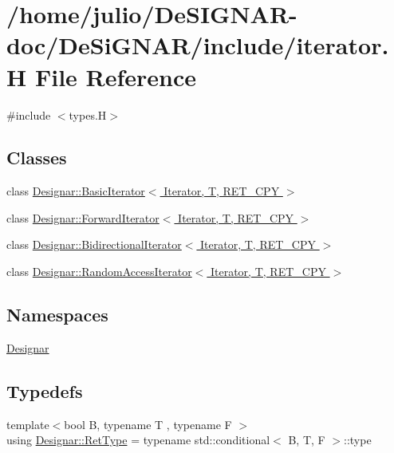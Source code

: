 \hypertarget{iterator_8_h}{}\section{/home/julio/\+De\+S\+I\+G\+N\+A\+R-\/doc/\+De\+Si\+G\+N\+A\+R/include/iterator.H File Reference}
\label{iterator_8_h}
{\ttfamily \#include $<$types.\+H$>$}\newline
\subsection*{Classes}
\begin{DoxyCompactItemize}
\item 
class \hyperlink{class_designar_1_1_basic_iterator}{Designar\+::\+Basic\+Iterator$<$ Iterator, T, R\+E\+T\+\_\+\+C\+P\+Y $>$}
\item 
class \hyperlink{class_designar_1_1_forward_iterator}{Designar\+::\+Forward\+Iterator$<$ Iterator, T, R\+E\+T\+\_\+\+C\+P\+Y $>$}
\item 
class \hyperlink{class_designar_1_1_bidirectional_iterator}{Designar\+::\+Bidirectional\+Iterator$<$ Iterator, T, R\+E\+T\+\_\+\+C\+P\+Y $>$}
\item 
class \hyperlink{class_designar_1_1_random_access_iterator}{Designar\+::\+Random\+Access\+Iterator$<$ Iterator, T, R\+E\+T\+\_\+\+C\+P\+Y $>$}
\end{DoxyCompactItemize}
\subsection*{Namespaces}
\begin{DoxyCompactItemize}
\item 
 \hyperlink{namespace_designar}{Designar}
\end{DoxyCompactItemize}
\subsection*{Typedefs}
\begin{DoxyCompactItemize}
\item 
{\footnotesize template$<$bool B, typename T , typename F $>$ }\\using \hyperlink{namespace_designar_ab937f9c4bf5f1d0e65dbc616245d50ee}{Designar\+::\+Ret\+Type} = typename std\+::conditional$<$ B, T, F $>$\+::type
\end{DoxyCompactItemize}
